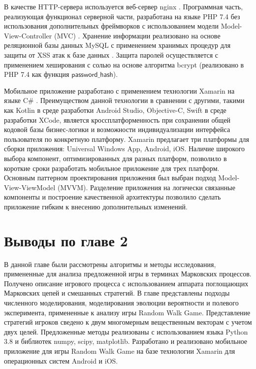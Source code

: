 В качестве HTTP-сервера используется веб-сервер nginx \cite{}. Программная часть, реализующая функционал серверной части, 
разработана на языке PHP 7.4 \cite{} без использования дополнительных фреймворков с использованием модели Model-View-Controller (MVC) \cite{}. 
Хранение информации реализовано на основе реляционной базы данных MySQL с применением хранимых процедур для защиты от XSS атак к базе данных \cite{}.
Защита паролей осуществляется с применением хеширования с солью на основе алгоритма bcrypt (реализовано в PHP 7.4 как функция $\mathsf{password\_hash}$).

Мобильное приложение разработано с применением технологии Xamarin на языке C$\mathsf{\#}$ \cite{}. Преимуществом данной технологии в сравнении с 
другими, такими как Kotlin в среде разработки Android Studio, Objective-C, Swift в среде разработки XCode, является кроссплатформенность
при сохранении общей кодовой базы бизнес-логики и возможности индивидуализации интерфейса пользователя по конкретную платформу.
Xamarin предлагает три платформы для сборки приложения: Universal Windows App, Android, iOS. Наличие широкого выбора компонент,
оптимизированных для разных платформ, позволило в короткие сроки разработать мобильное приложение для трех платформ.
Основным паттерном проектирования приложения был выбран подход Model-View-ViewModel (MVVM). Разделение приложения на логически
связанные компоненты и построение качественной архитектуры позволило сделать приложение гибким к внесению дополнительных изменений.

\section{Выводы по главе 2}\label{sec:ch2/sec4}

В данной главе были рассмотрены алгоритмы и методы исследования, примененные для анализа 
предложенной игры в терминах Марковских процессов. Получено описание игрового процесса 
с использованием аппарата поглощающих Марковских цепей и смешанных стратегий. В главе представлены
подходы численного моделирования, моделирования эволюции вероятности и полевого эксперимента, 
примененные к анализу игры Random Walk Game. Представление стратегий игроков сведено к двум многомерным вещественным векторам с учетом двух целей.
Предложенные методы реализованы с использованием языка Python 3.8 и библиотек numpy, scipy, matplotlib.
Разработано и реализовано мобильное приложение для игры Random Walk Game на базе технологии Xamarin
для операционных систем Android и iOS. 